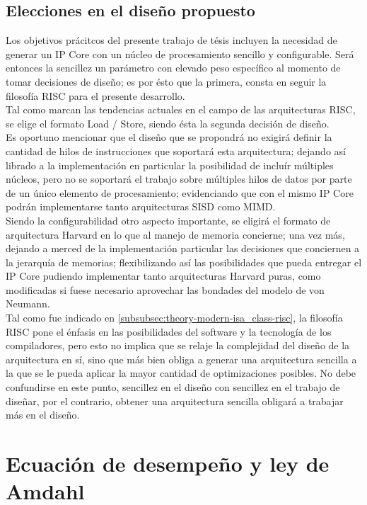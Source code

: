 \subsection{Elecciones en el diseño propuesto}

Los objetivos prácitcos del presente trabajo de tésis incluyen la necesidad de 
generar un IP Core con un núcleo de procesamiento sencillo y configurable. 
Será entonces la sencillez un parámetro con elevado peso específico 
al momento de tomar decisiones de diseño; es por ésto que la primera, consta en 
seguir la filosofía RISC para el presente desarrollo.\\
Tal como marcan las tendencias actuales en el campo de las arquitecturas RISC, 
se elige el formato Load / Store, siendo ésta la segunda decisión de 
diseño.\\
Es oportuno mencionar que el diseño que se propondrá no exigirá definir la 
cantidad de hilos de instrucciones que soportará esta arquitectura; dejando así 
librado a la implementación en particular la posibilidad de incluír múltiples 
núcleos, pero no se soportará el trabajo sobre múltiples hilos de datos por 
parte de un único elemento de procesamiento; evidenciando que con el mismo IP 
Core podrán implementarse tanto arquitecturas SISD como MIMD.\\
Siendo la configurabilidad otro aspecto importante, se eligirá el formato de 
arquitectura Harvard en lo que al manejo de memoria concierne; una vez más, 
dejando a merced de la implementación particular las decisiones que conciernen a 
la jerarquía de memorias; flexibilizando así las posibilidades que pueda 
entregar el IP Core pudiendo implementar tanto arquitecturas Harvard puras, 
como modificadas si fuese necesario aprovechar las bondades del modelo de von 
Neumann.\\
Tal como fue indicado en \ref{subsubsec:theory-modern-isa_class-risc}, la 
filosofía RISC pone el énfasis en las posibilidades del software y la 
tecnología de los compiladores, pero esto no implica que se relaje la 
complejidad del diseño de la arquitectura en sí, sino que más bien obliga a 
generar una arquitectura sencilla a la que se le pueda aplicar la mayor 
cantidad de optimizaciones posibles. No debe confundirse en este punto, 
sencillez en el diseño con sencillez en el trabajo de diseñar, por el 
contrario, obtener una arquitectura sencilla obligará a trabajar más en el 
diseño.

\section{Ecuación de desempeño y ley de Amdahl}
\label{sec:performance}

